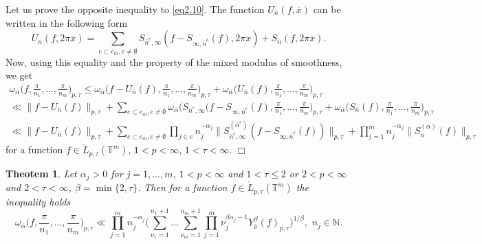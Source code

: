 \documentclass[12pt]{article}
\theoremstyle{plain}
\newtheorem{theorem}{Theotem}[section]
\begin{document}
Let us prove the opposite inequality to \eqref{eq2.10}. The function $ U_{\overline{n}} (f, \overline{x})$ can be written in the following form 
\begin{equation}\label{eq2.11}
 U_{\overline{n}} (f, 2\pi\overline{x})=\sum_{e\subset e_{m}, e\neq \emptyset}S_{\overline{n}^{e}, \infty}(f-S_{\infty, \overline{n}^{\hat{e}}}(f), 2\pi\overline{x}) + S_{\overline{n}}(f, 2\pi\overline{x}).  
\end{equation}
Now, using this equality and the property of the mixed modulus of smoothness, we get
  \begin{equation}\label{eq2.12}
 \begin{gathered}
\omega_{\overline\alpha}\bigl(f,\frac{\pi}{n_{1}},...,\frac{\pi}{n_{m}}\bigr)_{p, \tau} \leqslant \omega_{\overline\alpha}\bigl(f-U_{\overline{n}} (f), \frac{\pi}{n_{1}},...,\frac{\pi}{n_{m}}\bigr)_{p, \tau} + \omega_{\overline\alpha}\bigl(U_{\overline{n}} (f), \frac{\pi}{n_{1}},...,\frac{\pi}{n_{m}}\bigr)_{p, \tau} 
\\
\ll \|f - U_{\overline{n}} (f)\|_{p, \tau} + \sum_{e\subset e_{m}, e\neq \emptyset}\omega_{\overline\alpha}\bigl(S_{\overline{n}^{e}, \infty}(f-S_{\infty, \overline{n}^{\hat{e}}}(f), \frac{\pi}{n_{1}},...,\frac{\pi}{n_{m}}\bigr)_{p, \tau} + \omega_{\overline\alpha}\bigl(S_{\overline{n}}(f), \frac{\pi}{n_{1}},...,\frac{\pi}{n_{m}}\bigr)_{p, \tau}
\\
\ll \|f - U_{\overline{n}} (f)\|_{p, \tau} + \sum_{e\subset e_{m}, e\neq \emptyset} \prod_{j\in e}n_{j}^{-\alpha_{j}} \|S_{\overline{n}^{e}, \infty}^{(\overline{\alpha}^{e})}(f-S_{\infty, \overline{n}^{\hat{e}}}(f))\|_{p, \tau} + \prod_{j=1}^{m}n_{j}^{-\alpha_{j}}\|S_{\overline{n}}^{(\overline{\alpha})}(f)\|_{p, \tau}  
\end{gathered}
\end{equation}
for a function 
 $f\in {\mathring L}_{p, \tau}(\mathbb{T}^{m})$, $1< p<\infty$, $1< \tau < \infty$.
\hfill $\Box$

\begin{theorem}\label{th1.2}
Let $\alpha_{j}> 0$ for $j=1, \ldots , m$, $1< p<\infty$ and $1< \tau \leqslant 2$ or $2<p<\infty$ and $2<\tau<\infty$, $\beta=\min\{2, \tau\}$. Then for a function $f\in {\mathring L}_{p, \tau}(\mathbb{T}^{m})$ the inequality holds
  \begin{equation*}
 \omega_{\overline\alpha}\bigl(f,\frac{\pi}{n_{1}},...,\frac{\pi}{n_{m}}\bigr)_{p, \tau} \ll
 \prod_{j=1}^{m}n_{j}^{-\alpha_{j}}\Biggl(\sum\limits_{\nu_{1}=1}^{n_{1}+1} \ldots \sum\limits_{\nu_{m}=1}^{n_{m}+1} \prod_{j=1}^{m}\nu_{j}^{\beta\alpha_{j} - 1}Y_{\overline{\nu}}^{\beta}(f)_{p, \tau}\Biggr)^{1/\beta}, \,\, n_{j}\in \mathbb{N}.
 \end{equation*}
 \end{theorem}
\end{document}
